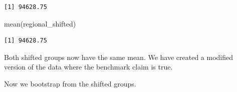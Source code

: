 \documentclass[
  letterpaper,
  DIV=11,
  numbers=noendperiod]{scrreprt}
\newenvironment{Shaded}{\begin{snugshade}}{\end{snugshade}}
\newcommand{\FunctionTok}[1]{\textcolor[rgb]{0.28,0.35,0.67}{#1}}
\newcommand{\NormalTok}[1]{\textcolor[rgb]{0.00,0.23,0.31}{#1}}
\newcommand{\OtherTok}[1]{\textcolor[rgb]{0.00,0.23,0.31}{#1}}
\newcommand{\SpecialCharTok}[1]{\textcolor[rgb]{0.37,0.37,0.37}{#1}}
\begin{document}
\begin{Shaded}
\end{Shaded}

\begin{verbatim}
[1] 94628.75
\end{verbatim}

\begin{Shaded}
\begin{Highlighting}[]
\FunctionTok{mean}\NormalTok{(regional\_shifted)}
\end{Highlighting}
\end{Shaded}

\begin{verbatim}
[1] 94628.75
\end{verbatim}

Both shifted groups now have the same mean. We have created a modified
version of the data where the benchmark claim is true.

Now we bootstrap from the shifted groups.
\end{document}
